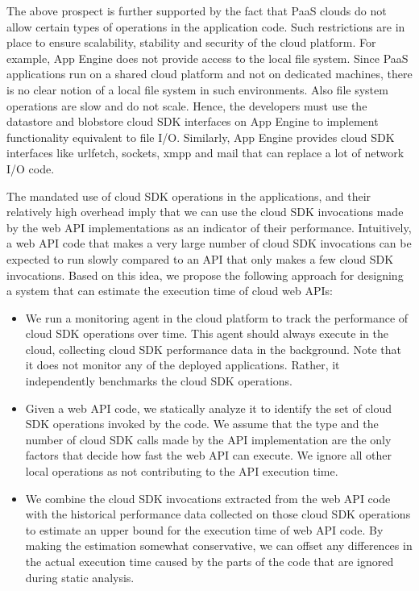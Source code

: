 The above prospect is further supported by the fact that PaaS clouds do not allow 
certain types of operations in the application code. Such restrictions are in place
to ensure scalability, stability and security of the cloud platform. For example, App Engine
does not provide access to the local file system. Since PaaS applications run on a shared cloud
platform and not on dedicated machines, there is no clear notion of a local file system in such environments.
Also file system operations are slow and do not scale.
Hence, the developers must use the datastore and blobstore cloud SDK interfaces on App
Engine to implement functionality equivalent to file I/O. Similarly, App Engine provides cloud SDK
interfaces like urlfetch, sockets, xmpp and mail that can replace a lot of network I/O code.

The mandated use of cloud SDK operations in the applications, and their relatively high overhead 
imply that we can use the cloud SDK
invocations made by the web API implementations as an indicator of their performance. Intuitively, a web API
code that makes a very large number of cloud SDK invocations can be expected to run slowly compared
to an API that only makes a few cloud SDK invocations. Based on this idea, we propose the following approach
for designing a system that can estimate the execution time of cloud web APIs:

\begin{itemize}
\item We run a monitoring agent in the cloud platform to track the performance of
cloud SDK operations over time. This agent should always execute in the cloud, collecting
cloud SDK performance data in the background. Note that it does not monitor any of the
deployed applications. Rather, it independently benchmarks the cloud SDK operations.
\item Given a web API code, we statically analyze it to identify the set of cloud SDK operations
invoked by the code. We assume that the type and the number of cloud SDK calls made by the API implementation
are the only factors that decide how fast the web API can execute. We ignore all other local operations
as not contributing to the API execution time.
\item We combine the cloud SDK invocations extracted from the web API code with the historical
performance data collected on those cloud SDK operations to estimate an upper bound for the
execution time of web API code. By making the estimation somewhat conservative, we can offset 
any differences in the actual execution time caused by the parts of the code that are ignored during
static analysis. 
\end{itemize}

